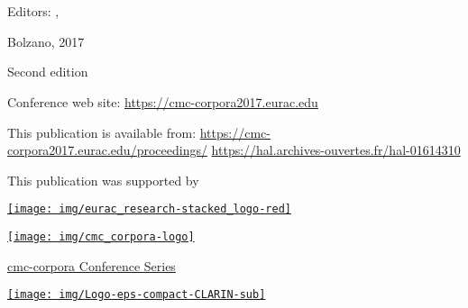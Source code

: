 \subject{Conference Proceedings}
\title{\thetitle}
\subtitle{3-4 October 2017, Eurac Research, Italy}

\author{}
\publishers{Editors \\ \authora \\ \authorb}
\date{}

\maketitle
\clearpage


\section*{\thetitle}
\noindent
Editors: \authora, \authorb

\bigskip
\noindent
Bolzano, 2017

\noindent
Second edition

\bigskip

\noindent
Conference web site:
\href{https://cmc-corpora2017.eurac.edu}{https://cmc-corpora2017.eurac.edu}

\medskip
\noindent
This publication is available from: \newline \smallskip
\phantom{} \quad \href{https://cmc-corpora2017.eurac.edu/proceedings/}{https://cmc-corpora2017.eurac.edu/proceedings/} \newline \smallskip
\phantom{} \quad \href{https://hal.archives-ouvertes.fr/hal-01614310}{https://hal.archives-ouvertes.fr/hal-01614310} \newline \smallskip
\phantom{} \quad 

\vfill

This publication was supported by

\noindent
\begin{minipage}{.33\textwidth}%
    \center
    \href{http://www.eurac.edu}{\texttt{[image: img/eurac\_research-stacked\_logo-red]}}
\end{minipage}%
\begin{minipage}{.33\textwidth}%
    \center
    \href{http://cmc-corpora.org}{\texttt{[image: img/cmc\_corpora-logo]}}

    \smallskip
    {\small \href{http://cmc-corpora.org}{cmc-corpora Conference Series}}
\end{minipage}
\begin{minipage}{.33\textwidth}%
    \center
    \href{https://www.clarin.eu}{\texttt{[image: img/Logo-eps-compact-CLARIN-sub]}}
\end{minipage}


